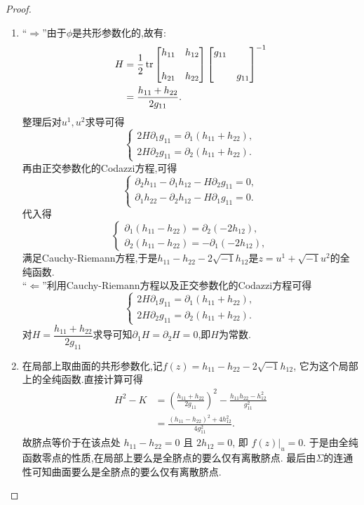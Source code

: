 	\begin{proof}
		\begin{enumerate}[label=(\roman*)]
			\item ``$\Rightarrow$''由于$\phi$是共形参数化的,故有:
			\begin{align*}
				H&=\frac{1}{2}\operatorname{tr}
				\begin{bmatrix}
					h_{11}&h_{12}\\ \\
					h_{21}&h_{22}
				\end{bmatrix}
				\begin{bmatrix}
					g_{11}&\\ \\
					&g_{11}
				\end{bmatrix}^{-1}\\
				&=\frac{h_{11}+h_{22}}{2g_{11}}.
			\end{align*}
			整理后对$u^{1},u^{2}$求导可得
			$$
			\begin{cases}
				2H\partial_{1}g_{11}=\partial_{1}(h_{11}+h_{22}),\\
				2H\partial_{2}g_{11}=\partial_{2}(h_{11}+h_{22}).
			\end{cases}
			$$
			再由正交参数化的Codazzi方程,可得
			$$
			\begin{cases}
				\partial_{2}h_{11}-\partial_{1}h_{12}-H\partial_{2}g_{11}=0,\\
				\partial_{1}h_{22}-\partial_{2}h_{12}-H\partial_{1}g_{11}=0.
			\end{cases}    
			$$
			代入得
			$$
			\begin{cases}
				\partial_{1}(h_{11}-h_{22})=\partial_{2}(-2h_{12}),\\
				\partial_{2}(h_{11}-h_{22})=-\partial_{1}(-2h_{12}),
			\end{cases}
			$$
			满足Cauchy-Riemann方程,于是$h_{11}-h_{22}-2\sqrt{-1}h_{12}$是$z = u^1 + \sqrt{-1}u^2$的全纯函数.\\
			``$\Leftarrow$''利用Cauchy-Riemann方程以及正交参数化的Codazzi方程可得
			$$
			\begin{cases}
				2H\partial_{1}g_{11}=\partial_{1}(h_{11}+h_{22}),\\ 
				2H\partial_{2}g_{11}=\partial_{2}(h_{11}+h_{22}).
			\end{cases}
			$$
			对$H=\dfrac{h_{11}+h_{22}}{2g_{11}}$求导可知$\partial_{1}H=\partial_{2}H=0$,即$H$为常数.
			\item 在局部上取曲面的共形参数化,记$f(z) = h_{11} - h_{22} - 2\sqrt{-1}h_{12}$, 它为这个局部上的全纯函数.直接计算可得
			\begin{align*}
				H^2 - K &= \left(\frac{h_{11} + h_{22}}{2g_{11}}\right)^2-\frac{h_{11}h_{22}-h_{12}^2}{g_{11}^{2}}\\
				&= \frac{(h_{11} - h_{22})^2 + 4 h_{12}^2}{4g_{11}^2}.
			\end{align*}
			故脐点等价于在该点处 $h_{11} - h_{22} = 0$ 且 $2h_{12} = 0$, 即 $f(z)\bigr|_u = 0$.
            于是由全纯函数零点的性质,在局部上要么是全脐点的要么仅有离散脐点.
            最后由$\Sigma$的连通性可知曲面要么是全脐点的要么仅有离散脐点.\qedhere
		\end{enumerate}
	\end{proof}
	
